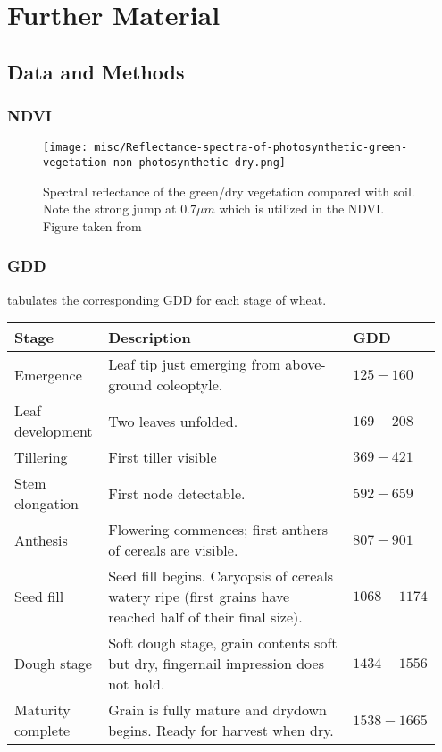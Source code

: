 \chapter{Further Material}

\section{Data and Methods}{
    \subsection{NDVI}
		\begin{figure}[H]
			\centering
			\texttt{[image: misc/Reflectance-spectra-of-photosynthetic-green-vegetation-non-photosynthetic-dry.png]}
			\vspace{0.15cm}
			\caption[Spectral reflectance of the green/dry vegetation]{Spectral reflectance of the green/dry vegetation compared with soil. Note the strong jump at $0.7\mu m$ which is utilized in the NDVI. Figure taken from \cite{verhoevenLookingBlackTintedGlasses2006}}
			\label{fig:misc/Reflectance-spectra-of-photosynthetic-green-vegetation-non-photosynthetic-dry.png}
		\end{figure}
	\subsection{GDD}\label{app:gdd_examples}
		\cite{millerUsingGrowingDegree2018} tabulates the corresponding GDD for each stage of wheat.
		
			\begin{tabular}{p{0.22\linewidth} p{0.6\linewidth}  p{0.13\linewidth}} 
				\toprule
				Stage  & Description    & GDD \\
				\hline Emergence & Leaf tip just emerging from above-ground coleoptyle. & $125-160$ \\
				\hline Leaf development & Two leaves unfolded. & $169-208$ \\
				\hline Tillering & First tiller visible  & $369-421$ \\
				\hline Stem elongation & First node detectable. & $592-659$ \\
				\hline Anthesis & Flowering commences; first anthers of cereals are visible. & $807-901$ \\
				\hline Seed fill & Seed fill begins. Caryopsis of cereals watery ripe (first grains have reached half of their final size). & $1068-1174$ \\
				\hline Dough stage & Soft dough stage, grain contents soft but dry, fingernail impression does not hold. & $1434-1556$ \\
				\hline Maturity complete & Grain is fully mature and drydown begins. Ready for harvest when dry. & $1538-1665$ \\
				\bottomrule
			\end{tabular}
}


